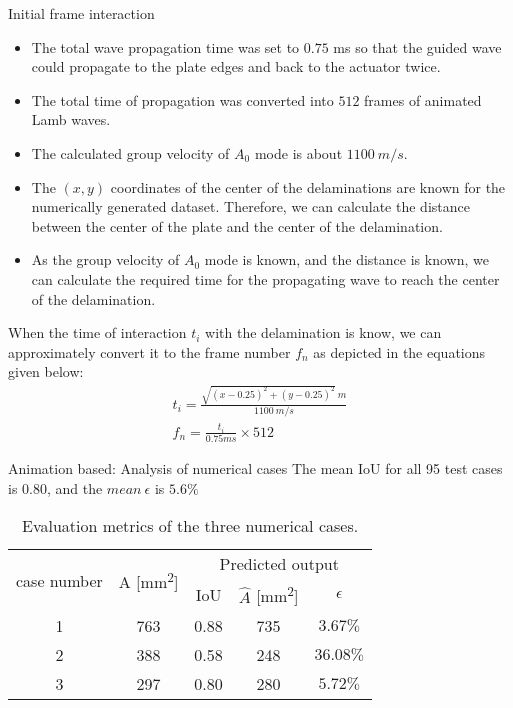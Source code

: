 \documentclass[10pt,aspectratio=169,dvipsnames]{beamer} %
\begin{document}
	\begin{frame}{Initial frame interaction}
		\begin{itemize}
			\item The total wave propagation time was set to \(0.75\) ms so that the guided wave could propagate to the plate edges and back to the actuator twice.
			\item The total time of propagation was converted into \(512\) frames of animated Lamb waves.
			\item The calculated group velocity of \(A_0\) mode is about \(1100\ m/s\).
			\item The \((x, y)\) coordinates of the center of the delaminations are known for the numerically generated dataset. 
			Therefore, we can calculate the distance between the center of the plate and the center of the delamination.
			\item As the group velocity of \(A_0\) mode is known, and the distance is known, we can calculate the required time for the propagating wave to reach the center of the delamination. 
		\end{itemize}
		
		When the time of interaction \(t_i\) with the delamination is know, we can approximately convert it to the frame number \(f_n\) as depicted in the equations given below:		
		\begin{gather*}
			t_i = \frac{\sqrt{(x-0.25)^2 +(y-0.25)^2} \ m}{1100\ m/s}
			\\
			f_n = \frac{t_i}{0.75ms} \times 512
		\end{gather*}			
	\end{frame}
	\begin{frame}{Animation based: Analysis of numerical cases}
		The mean IoU for all 95 test cases is 0.80, and the \(mean\ \epsilon\) is \(5.6\%\)
		\begin{table}[!h]
			\centering
			\caption{Evaluation metrics of the three numerical cases.}
			\begin{tabular}{ccccc}
				\toprule[1.5pt]
				\multirow{2}{*}{case number} & \multicolumn{1}{c}{\multirow{2}{*}{A [mm\textsuperscript{2}]}} & \multicolumn{3}{c}{Predicted output} \\ 
				\cmidrule(lr){3-5} & & \multicolumn{1}{c}{IoU} & \multicolumn{1}{c}{\(\hat{A}\) [mm\textsuperscript{2}]} & \(\epsilon\) \\
				\midrule
				1 & 763 & \multicolumn{1}{c}{0.88} & \multicolumn{1}{c}{735} & \(3.67\%\) \\ 
				2 & 388 & \multicolumn{1}{c}{0.58} & \multicolumn{1}{c}{248} & \(36.08\%\) \\ 
				3 & 297 & \multicolumn{1}{c}{0.80} & \multicolumn{1}{c}{280} & \(5.72\%\) \\			 					
				\bottomrule[1.5pt]
			\end{tabular}	
			\label{tab:num_cases_}
		\end{table}			
	\end{frame}
\end{document}
